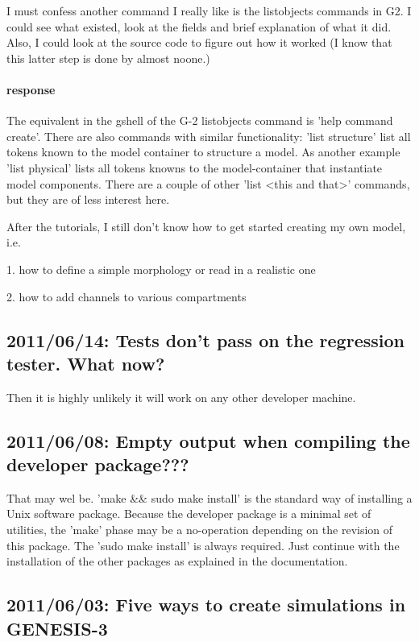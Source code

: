 \documentclass[12pt]{article}
\begin{document}
I must confess another command I really like is the listobjects
commands in G2. I could see what existed, look at the fields and brief
explanation of what it did.  Also, I could look at the source code to
figure out how it worked (I know that this latter step is done by
almost noone.)

\paragraph{response} The equivalent in the gshell of the G-2
listobjects command is 'help command create'.  There are also commands
with similar functionality: 'list structure' list all tokens known to
the model container to structure a model.  As another example 'list
physical' lists all tokens knowns to the model-container that
instantiate model components.  There are a couple of other 'list <this
and that>' commands, but they are of less interest here.


After the tutorials, I still don't know how to get started creating my
own model, i.e.

1. how to define a simple morphology or read in a realistic one

2. how to add channels to various compartments


\subsection{2011/06/14: Tests don't pass on the regression tester.
  What now?}

Then it is highly unlikely it will work on any other developer
machine.


\subsection{2011/06/08: Empty output when compiling the developer package???}

That may wel be.  'make \&\& sudo make install' is the standard way of
installing a Unix software package.  Because the developer package is
a minimal set of utilities, the 'make' phase may be a no-operation
depending on the revision of this package.  The 'sudo make install' is
always required.  Just continue with the installation of the other
packages as explained in the documentation.


\subsection{2011/06/03: Five ways to create simulations in GENESIS-3}
\end{document}
